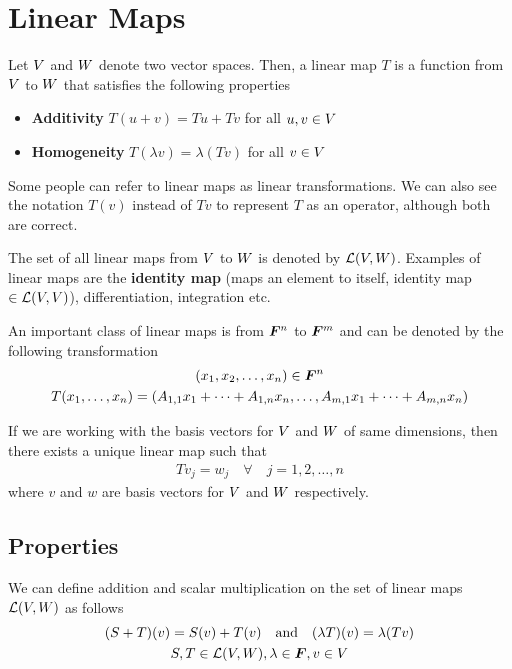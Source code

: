 \documentclass[../../linear_algebra.tex]{subfiles}
\begin{document}
\section{Linear Maps}
Let $V$ and $W$ denote two vector spaces. Then, a linear map $T$ is a function from $V$ to $W$ that satisfies the following properties
\begin{itemize}
    \item \textbf{Additivity}\newline
    $T(u + v) = Tu + Tv$ for all $u,v \in V$
    \item \textbf{Homogeneity}\newline
    $T(\lambda v) = \lambda(Tv)$ for all $v \in V$
\end{itemize}
Some people can refer to linear maps as linear transformations. We can also see the notation $T(v)$ instead of $Tv$ to represent $T$ as an operator, although both are correct.\newline

The set of all linear maps from $V$ to $W$ is denoted by $\mathcal{L}(V, W)$. Examples of linear maps are the \textbf{identity map} (maps an element to itself, identity map $\in \mathcal{L}(V, V)$), differentiation, integration etc.\newline

An important class of linear maps is from $\bm{F}^{n}$ to $\bm{F}^{m}$ and can be denoted by the following transformation
\begin{gather*}
(x_{1}, x_{2}, \ldots, x_{n}) \in \bm{F}^{n}\\
    T(x_{1}, \ldots, x_{n}) = (A_{1,1}x_{1} + \cdots + A_{1,n}x_{n}, \ldots, A_{m,1}x_{1} + \cdots + A_{m,n}x_{n})
\end{gather*}

If we are working with the basis vectors for $V$ and $W$ of same dimensions, then there exists a unique linear map such that
\begin{align*}
    Tv_{j} = w_{j} \quad \forall \quad j = 1,2,\ldots,n
\end{align*}
where $v$ and $w$ are basis vectors for $V$ and $W$ respectively.

\subsection{Properties}
We can define addition and scalar multiplication on the set of linear maps $\mathcal{L}(V, W)$ as follows
\begin{gather*}
    (S + T)(v) = S(v) + T(v) \quad \text{and} \quad (\lambda T)(v) = \lambda(Tv)\\
    S,T \in \mathcal{L}(V, W), \lambda \in \bm{F}, v \in V
\end{gather*}
\end{document}
